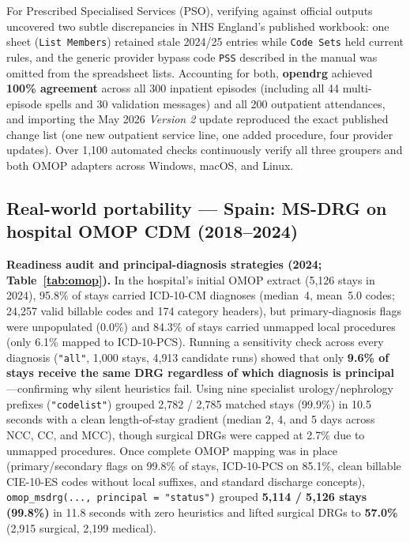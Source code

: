 \documentclass[fleqn,10pt]{IOMEDArticle}
\begin{document}
For Prescribed Specialised Services (PSO), verifying against official outputs uncovered two subtle discrepancies in NHS England's published workbook: one sheet (\texttt{List Members}) retained stale 2024/25 entries while \texttt{Code Sets} held current rules, and the generic provider bypass code \texttt{PSS} described in the manual was omitted from the spreadsheet lists. Accounting for both, \textbf{opendrg} achieved \textbf{100\% agreement} across all 300 inpatient episodes (including all 44 multi-episode spells and 30 validation messages) and all 200 outpatient attendances, and importing the May 2026 \emph{Version 2} update reproduced the exact published change list (one new outpatient service line, one added procedure, four provider updates). Over 1{,}100 automated checks continuously verify all three groupers and both OMOP adapters across Windows, macOS, and Linux.

\subsection{Real-world portability — Spain: MS-DRG on hospital OMOP CDM (2018--2024)}

\textbf{Readiness audit and principal-diagnosis strategies (2024; Table~\ref{tab:omop}).} In the hospital's initial OMOP extract (5{,}126 stays in 2024), 95.8\% of stays carried ICD-10-CM diagnoses (median~4, mean~5.0 codes; 24{,}257 valid billable codes and 174 category headers), but primary-diagnosis flags were unpopulated (0.0\%) and 84.3\% of stays carried unmapped local procedures (only 6.1\% mapped to ICD-10-PCS). Running a sensitivity check across every diagnosis (\texttt{"all"}, 1{,}000 stays, 4{,}913 candidate runs) showed that only \textbf{9.6\% of stays receive the same DRG regardless of which diagnosis is principal}---confirming why silent heuristics fail. Using nine specialist urology/nephrology prefixes (\texttt{"codelist"}) grouped 2{,}782 / 2{,}785 matched stays (99.9\%) in 10.5 seconds with a clean length-of-stay gradient (median 2, 4, and 5 days across NCC, CC, and MCC), though surgical DRGs were capped at 2.7\% due to unmapped procedures. Once complete OMOP mapping was in place (primary/secondary flags on 99.8\% of stays, ICD-10-PCS on 85.1\%, clean billable CIE-10-ES codes without local suffixes, and standard discharge concepts), \texttt{omop\_msdrg(..., principal = "status")} grouped \textbf{5{,}114 / 5{,}126 stays (99.8\%)} in 11.8 seconds with zero heuristics and lifted surgical DRGs to \textbf{57.0\%} (2{,}915 surgical, 2{,}199 medical).
\end{document}
